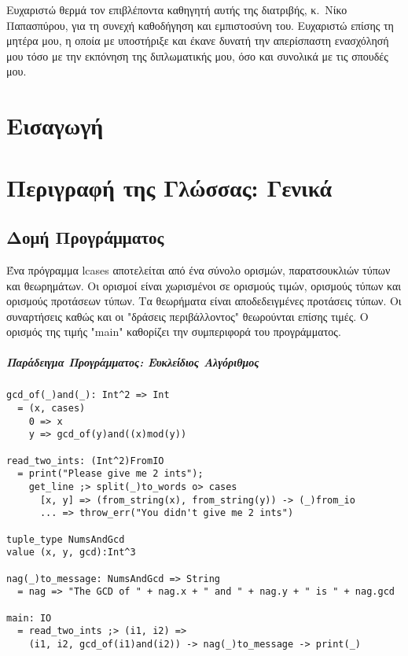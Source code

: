 \documentclass[diploma]{softlab-thesis}
\begin{document}

\begin{acknowledgementsgr}
  Ευχαριστώ θερμά τον επιβλέποντα καθηγητή αυτής της διατριβής,
  κ.~Νίκο Παπασπύρου, για τη συνεχή καθοδήγηση και εμπιστοσύνη
  του. Ευχαριστώ επίσης τη μητέρα μου, η οποία με
  υποστήριξε και έκανε δυνατή την απερίσπαστη ενασχόλησή μου τόσο
  με την εκπόνηση της διπλωματικής μου, όσο και συνολικά με τις
  σπουδές μου.
\end{acknowledgementsgr}


\tableofcontents



\mainmatter

\chapter{Εισαγωγή}

\chapter{Περιγραφή της Γλώσσας: Γενικά}

\section{Δομή Προγράμματος}

Ένα πρόγραμμα lcases αποτελείται από ένα σύνολο ορισμών, παρατσουκλιών τύπων
και θεωρημάτων. Οι ορισμοί είναι χωρισμένοι σε ορισμούς τιμών, ορισμούς τύπων
και ορισμούς προτάσεων τύπων. Τα θεωρήματα είναι αποδεδειγμένες προτάσεις
τύπων. Οι συναρτήσεις καθώς και οι "δράσεις περιβάλλοντος" θεωρούνται επίσης
τιμές.  Ο ορισμός της τιμής "main" καθορίζει την συμπεριφορά του προγράμματος.

\paragraph{Παράδειγμα Προγράμματος: Ευκλείδιος Αλγόριθμος}
\begin{verbatim}
gcd_of(_)and(_): Int^2 => Int
  = (x, cases)
    0 => x
    y => gcd_of(y)and((x)mod(y))

read_two_ints: (Int^2)FromIO
  = print("Please give me 2 ints");
    get_line ;> split(_)to_words o> cases
      [x, y] => (from_string(x), from_string(y)) -> (_)from_io
      ... => throw_err("You didn't give me 2 ints")

tuple_type NumsAndGcd
value (x, y, gcd):Int^3

nag(_)to_message: NumsAndGcd => String
  = nag => "The GCD of " + nag.x + " and " + nag.y + " is " + nag.gcd

main: IO
  = read_two_ints ;> (i1, i2) =>
    (i1, i2, gcd_of(i1)and(i2)) -> nag(_)to_message -> print(_)
\end{verbatim}
\end{document}
